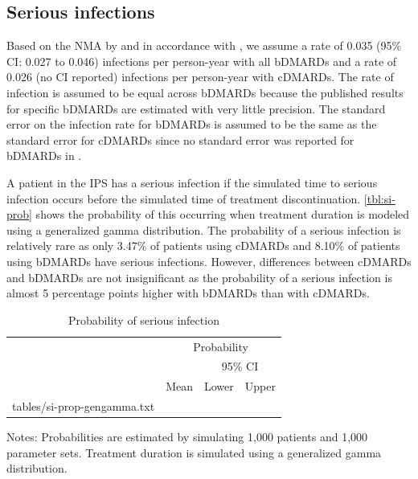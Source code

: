 \documentclass[11pt,final,fleqn]{article}\usepackage[]{graphicx}\usepackage[]{color}
\makeatletter
\theoremstyle{plain}
\newcommand*\ExpandableInput[1]{\@@input#1 }
\makeatother
\begin{document}
\subsection{Serious infections}
Based on the NMA by \citet{singh2011adverse} and in accordance with \citet{stevenson2016adalimumab}, we assume a rate of 0.035 (95\% CI: 0.027 to 0.046) infections per person-year with all bDMARDs and a rate of 0.026 (no CI reported) infections per person-year with cDMARDs. The rate of infection is assumed to be equal across bDMARDs because the published results for specific bDMARDs are estimated with very little precision. The standard error on the infection rate for bDMARDs is assumed to be the same as the standard error for cDMARDs since no standard error was reported for bDMARDs in \citet{singh2011adverse}.



A patient in the IPS has a serious infection if the simulated time to serious infection occurs before the simulated time of treatment discontinuation. \autoref{tbl:si-prob} shows the probability of this occurring when treatment duration is modeled using a generalized gamma distribution. The probability of a serious infection is relatively rare as only 3.47\% of patients using cDMARDs and 8.10\% of patients using bDMARDs have serious infections. However, differences between cDMARDs and bDMARDs are not insignificant as the probability of a serious infection is almost 5 percentage points higher with bDMARDs than with cDMARDs.

\begin{table}[!ht]
\begin{center}
\begin{threeparttable}
\caption{Probability of serious infection} \label{tbl:si-prob}
\begin{tabularx}{\textwidth}{@{\extracolsep{\fill}}lrrr}
\hline
\multicolumn{1}{l}{} & \multicolumn{3}{c}{Probability} \\
\cmidrule{2-4} 
\multicolumn{2}{l}{} & \multicolumn{2}{c}{95\% CI} \\
\cmidrule{3-4} 
\multicolumn{1}{c}{} & \multicolumn{1}{c}{Mean} & \multicolumn{1}{c}{Lower} & \multicolumn{1}{c}{Upper} \\
\hline
\ExpandableInput{tables/si-prop-gengamma.txt}
\hline
\end{tabularx}
\scriptsize
Notes: Probabilities are estimated by simulating 1,000 patients and 1,000 parameter sets. Treatment duration is simulated using a generalized gamma distribution. 
\end{threeparttable}
\end{center}
\end{table}
\end{document}
